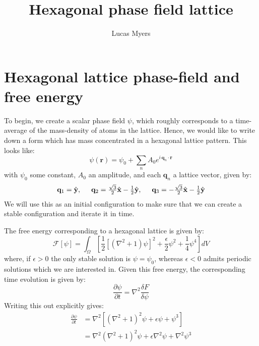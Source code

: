 \documentclass[reqno]{article}
\begin{document}
\title{Hexagonal phase field lattice}
\author{Lucas Myers}
\maketitle

\section{Hexagonal lattice phase-field and free energy}
To begin, we create a scalar phase field $\psi$, which roughly corresponds to a time-average of the mass-density of atoms in the lattice.
Hence, we would like to write down a form which has mass concentrated in a hexagonal lattice pattern.
This looks like:
\begin{equation}
    \psi(\mathbf{r})
    =
    \psi_0
    +
    \sum_n A_0 e^{i \, \mathbf{q}_n \cdot \mathbf{r}}
\end{equation}
with $\psi_0$ some constant, $A_0$ an amplitude, and each $\mathbf{q}_n$ a lattice vector, given by:
\begin{equation}
    \mathbf{q}_1 = \hat{\mathbf{y}}, \hspace{0.5cm}
    \mathbf{q}_2 = \tfrac{\sqrt{3}}{2} \hat{\mathbf{x}} - \tfrac12 \hat{\mathbf{y}}, \hspace{0.5cm}
    \mathbf{q}_3 = -\tfrac{\sqrt{3}}{2} \hat{\mathbf{x}} - \tfrac12 \hat{\mathbf{y}}
\end{equation}
We will use this as an initial configuration to make sure that we can create a stable configuration and iterate it in time.

The free energy corresponding to a hexagonal lattice is given by:
\begin{equation}
    \mathcal{F}[\psi]
    =
    \int_\Omega \left[
    \frac12 \left[ \left(\nabla^2 + 1\right) \psi \right]^2
    + \frac{\epsilon}{2} \psi^2
    + \frac14 \psi^4
    \right] dV
\end{equation}
where, if $\epsilon > 0$ the only stable solution is $\psi = \psi_0$, whereas $\epsilon < 0$ admits periodic solutions which we are interested in.
Given this free energy, the corresponding time evolution is given by:
\begin{equation}
    \frac{\partial \psi}{\partial t}
    =
    \nabla^2 \frac{\delta F}{\delta \psi}
\end{equation}
Writing this out explicitly gives:
\begin{equation}
\begin{split}
    \frac{\partial \psi}{\partial t}
    &=
    \nabla^2 \left[\left(\nabla^2 + 1\right)^2 \psi
    + \epsilon \psi
    + \psi^3
    \right] \\
    &=
    \nabla^2 \left(\nabla^2 + 1 \right)^2 \psi
    + \epsilon \nabla^2 \psi
    + \nabla^2 \psi^3
\end{split}
\end{equation}
\end{document}
